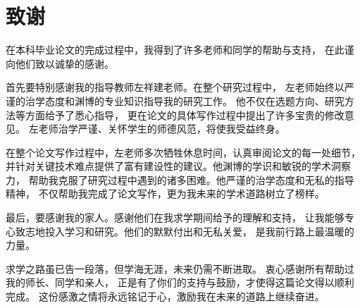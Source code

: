
\chapter{致谢}
 {\songti\xiaosi
  \setlength{\parindent}{2em}
  在本科毕业论文的完成过程中，我得到了许多老师和同学的帮助与支持，
  在此谨向他们致以诚挚的感谢。}\par

{\songti\xiaosi
	首先要特别感谢我的指导教师左祥建老师。在整个研究过程中，
	左老师始终以严谨的治学态度和渊博的专业知识指导我的研究工作。
	他不仅在选题方向、研究方法等方面给予了悉心指导，
	更在论文的具体写作过程中提出了许多宝贵的修改意见。
	左老师治学严谨、关怀学生的师德风范，将使我受益终身。}\par

{\songti\xiaosi
	在整个论文写作过程中，左老师多次牺牲休息时间，认真审阅论文的每一处细节，
	并针对关键技术难点提供了富有建设性的建议。他渊博的学识和敏锐的学术洞察力，
	帮助我克服了研究过程中遇到的诸多困难。他严谨的治学态度和无私的指导精神，
	不仅帮助我完成了论文写作，更为我未来的学术道路树立了榜样。}

{\songti\xiaosi
	最后，要感谢我的家人。感谢他们在我求学期间给予的理解和支持，
	让我能够专心致志地投入学习和研究。他们的默默付出和无私关爱，
	是我前行路上最温暖的力量。}\par

{\songti\xiaosi
	求学之路虽已告一段落，但学海无涯，未来仍需不断进取。
	衷心感谢所有帮助过我的师长、同学和亲人，
	正是有了你们的支持与鼓励，才使得这篇论文得以顺利完成。
	这份感激之情将永远铭记于心，激励我在未来的道路上继续奋进。}


\newpage\quad %
